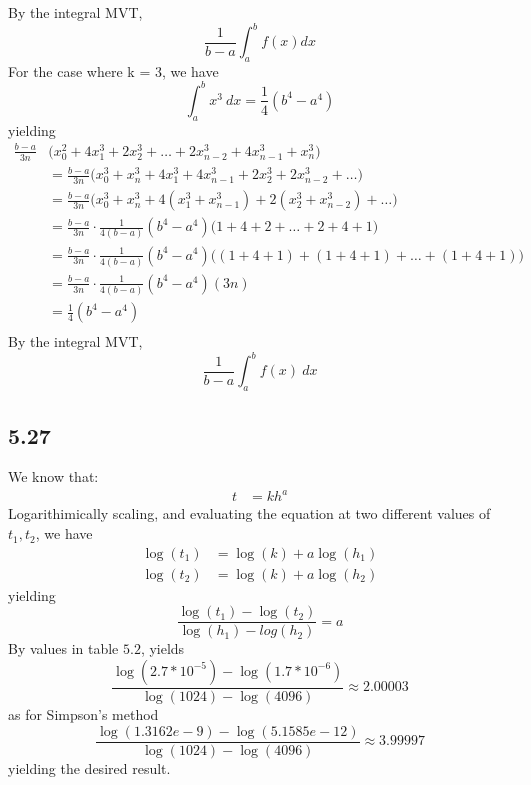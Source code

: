 \documentclass[letterpaper,12pt]{article}
\theoremstyle{definition}
\begin{document}
By the integral MVT, \[\frac{1}{b-a}\int_a^b f(x)  dx\]
For the case where k = 3, we have
\[ \int_a^b x^3 ~ dx = \frac{1}{4} (b^4 - a^4) \]
yielding 
\begin{align*}
    \frac{b-a}{3n} &\big( x_0^2 + 4x_1^3 + 2x_2^3 + \dots + 2x_{n-2}^3 + 4x_{n-1}^3 + x_n^3 \big)\\
    &= \frac{b-a}{3n} \big( x_0^3 + x_n^3 + 4x_1^3 + 4x_{n-1}^3 + 2x_2^3 + 2x_{n-2}^3 + \dots\big)\\ 
    &= \frac{b-a}{3n} \big( x_0^3 + x_n^3 + 4( x_1^3 + x_{n-1}^3) + 2 (x_2^3 + x_{n-2}^3) + \dots\big)\\ 
    &= \frac{b-a}{3n} \cdot \frac{1}{4(b-a)}(b^4 - a^4)\big( 1 + 4 + 2 + \dots + 2 + 4 + 1 \big)\\  
    &= \frac{b-a}{3n} \cdot \frac{1}{4(b-a)}(b^4 - a^4)\big( (1 + 4 + 1) + (1 + 4 + 1) + \dots + (1 + 4 + 1) \big)\\
    &= \frac{b-a}{3n} \cdot \frac{1}{4(b-a)}(b^4 - a^4)(3n)\\
    &= \frac{1}{4} (b^4 - a^4)\\
\end{align*}
By the integral MVT, \[\frac{1}{b-a}\int_a^b f(x) ~ dx\]

\subsection*{5.27}
We know that:
\begin{align*}
    t &= kh^a 
\end{align*}
Logarithimically scaling, and evaluating the equation at two different values of $t_1,t_2$, we have
\begin{align*}
    \log(t_1)& = \log(k) + a \log(h_1)\\
    \log(t_2)& = \log(k) + a \log(h_2)
\end{align*}
yielding
\[\frac{\log(t_1) -\log(t_2)}{\log(h_1) - log(h_2)} = a \]
By values in table $5.2$, yields 
\[\frac{\log(2.7*10^{-5}) -\log(1.7*10^{-6})}{\log(1024) - \log(4096)} \approx 2.00003 \]
as for Simpson's method
\[\frac{\log(1.3162e-9) -\log(5.1585e-12)}{\log(1024) - \log(4096)} \approx 3.99997 \]
yielding the desired result.
\end{document}
